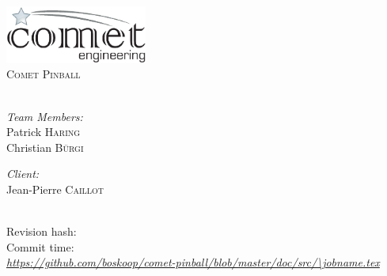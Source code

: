 % 
% 
% 
%
%
% 
%

\begin{titlepage}

\begin{center}

\includegraphics[width=0.35\textwidth]{./comet-logo.eps}\\[2.5cm]    

\textsc{\Large Comet Pinball}\\[2cm]

{ \huge \bfseries \doctitle{}}\\[3cm]

\begin{minipage}{0.45\textwidth}
\begin{flushleft} \large
\emph{Team Members:}\\
Patrick \textsc{Haring}\\
Christian \textsc{Bürgi}
\end{flushleft}
\end{minipage}
\begin{minipage}{0.45\textwidth}
\begin{flushright} \large
\emph{Client:} \\
Jean-Pierre \textsc{Caillot}\\
~
\end{flushright}
\end{minipage}

\vfill

{\large 
Revision hash: \gitAbbrevHash \\[0.2cm]
Commit time: \gitCommitterIsoDate \\[0.2cm]
{\footnotesize \itshape \url{https://github.com/boskoop/comet-pinball/blob/master/doc/src/\jobname.tex}}}

\end{center}

\end{titlepage}